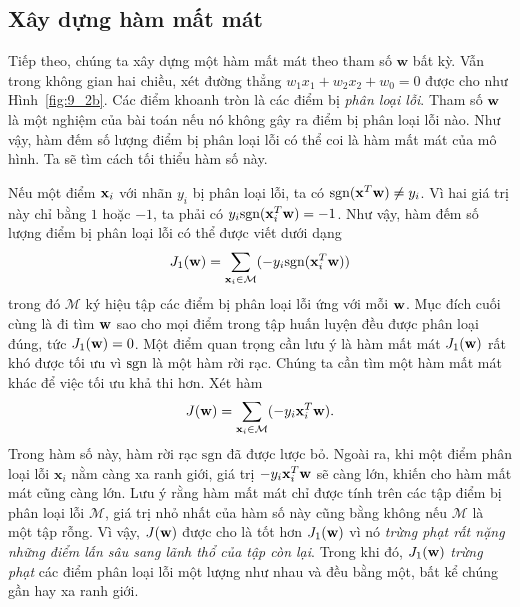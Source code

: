 \subsection{Xây dựng hàm mất mát}
Tiếp theo, chúng ta xây dựng một hàm mất mát theo tham số $\mathbf{w}$ bất kỳ.
Vẫn trong không gian hai chiều, xét đường thẳng $w_1x_1 + w_2x_2 + w_0 = 0$ được
cho như Hình~\ref{fig:9_2b}. Các điểm khoanh tròn là các điểm bị \textit{phân
loại lỗi}. Tham số $\mathbf{w}$ là một nghiệm của bài toán nếu nó không gây ra điểm bị phân loại lỗi nào. Như vậy, hàm đếm số lượng điểm bị phân loại lỗi có thể coi là hàm mất mát của mô hình. Ta sẽ tìm cách tối thiểu hàm số này.

Nếu một điểm $\mathbf{x}_i$ với nhãn $y_i$ bị phân loại lỗi, ta có $\text{sgn}(\mathbf{x}^T\mathbf{w})
\neq y_i$. Vì hai giá trị này chỉ bằng $1$ hoặc $-1$, ta phải có
$y_i\text{sgn}(\mathbf{x}_i^T\mathbf{w}) = -1$. Như vậy, hàm đếm số lượng điểm bị phân loại lỗi có
thể được viết dưới dạng
\begin{equation}
J_1(\mathbf{w}) = \sum_{\mathbf{x}_i \in \mathcal{M}} (-y_i\text{sgn}(\mathbf{x}_i^T\mathbf{w}))
\end{equation}
trong đó $\mathcal{M}$ ký hiệu tập các điểm bị phân loại lỗi ứng với mỗi $\mathbf{w}$. Mục đích cuối cùng là đi tìm $\mathbf{w}$ sao cho mọi điểm trong tập huấn luyện đều được phân loại đúng, tức $J_1(\mathbf{w}) = 0$. Một điểm quan trọng cần lưu ý là hàm mất mát $J_1(\mathbf{w})$ rất khó được tối ưu vì $\text{sgn}$ là một hàm rời rạc. Chúng ta cần tìm một hàm mất mát khác để việc tối ưu khả thi hơn.
Xét hàm
\begin{equation}
J(\mathbf{w}) = \sum_{\mathbf{x}_i \in \mathcal{M}} (-y_i\mathbf{x}_i^T\mathbf{w}).
\end{equation}
Trong hàm số này, hàm rời rạc $\text{sgn}$ đã được lược bỏ. Ngoài ra, khi một
điểm phân loại lỗi $\mathbf{x}_i$ nằm càng xa ranh giới, giá trị
$-y_i\mathbf{x}_i^T\mathbf{w}$ sẽ càng lớn, khiến cho hàm mất mát cũng càng lớn. Lưu ý rằng
hàm mất mát chỉ được tính trên các tập điểm bị phân loại lỗi $\mathcal{M}$, giá
trị nhỏ nhất của hàm số này cũng bằng không nếu $\mathcal{M}$ là một tập rỗng.
Vì vậy, $J(\mathbf{w})$ được cho là tốt hơn $J_1(\mathbf{w})$ vì nó \textit{trừng phạt rất
nặng những điểm lấn sâu sang lãnh thổ của tập còn lại}. Trong khi đó,
$J_1(\mathbf{w})$ \textit{trừng phạt} các điểm phân loại lỗi một lượng như nhau và đều
bằng một, bất kể chúng gần hay xa ranh giới.

